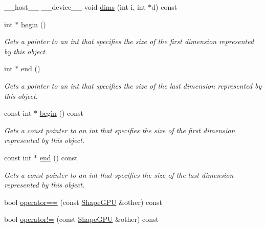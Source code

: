 \begin{DoxyCompactItemize}
\item 
\+\_\+\+\_\+host\+\_\+\+\_\+ \+\_\+\+\_\+device\+\_\+\+\_\+ void \hyperlink{structmarian_1_1ShapeGPU_a35f26e62cc21105d42ab2e872298d01a}{dims} (int i, int $\ast$d) const 
\item 
int $\ast$ \hyperlink{structmarian_1_1ShapeGPU_ad554ee83ce80bb45f6ae0cb1f3757a13}{begin} ()
\begin{DoxyCompactList}\small\item\em Gets a pointer to an int that specifies the size of the first dimension represented by this object. \end{DoxyCompactList}\item 
int $\ast$ \hyperlink{structmarian_1_1ShapeGPU_a72aa4cb98ce3cfd74f4a32ffbdc5731c}{end} ()
\begin{DoxyCompactList}\small\item\em Gets a pointer to an int that specifies the size of the last dimension represented by this object. \end{DoxyCompactList}\item 
const int $\ast$ \hyperlink{structmarian_1_1ShapeGPU_aee7df6d72cd1f6902bbf6b55204f3c9f}{begin} () const 
\begin{DoxyCompactList}\small\item\em Gets a const pointer to an int that specifies the size of the first dimension represented by this object. \end{DoxyCompactList}\item 
const int $\ast$ \hyperlink{structmarian_1_1ShapeGPU_a2b79e2858c5728c879ecdbe715d1fef5}{end} () const 
\begin{DoxyCompactList}\small\item\em Gets a const pointer to an int that specifies the size of the last dimension represented by this object. \end{DoxyCompactList}\item 
bool \hyperlink{structmarian_1_1ShapeGPU_ad0c633b0b24bd5fe274cd5fd82829edf}{operator==} (const \hyperlink{structmarian_1_1ShapeGPU}{Shape\+G\+PU} \&other) const 
\item 
bool \hyperlink{structmarian_1_1ShapeGPU_a17fd00f6b6ead0006f376cf97595c1d6}{operator!=} (const \hyperlink{structmarian_1_1ShapeGPU}{Shape\+G\+PU} \&other) const 
\end{DoxyCompactItemize}
